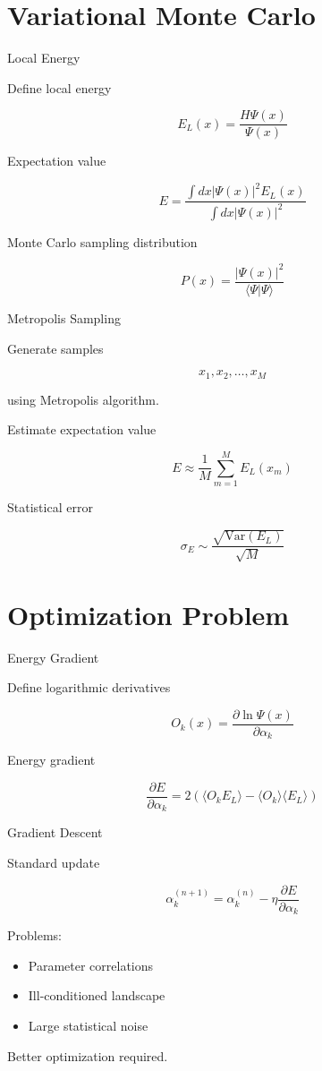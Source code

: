 \documentclass{beamer}
\begin{document}
\section{Variational Monte Carlo}

\begin{frame}{Local Energy}

Define local energy

\[
E_L(x) =
\frac{H\Psi(x)}{\Psi(x)}
\]

Expectation value

\[
E = \frac{\int dx |\Psi(x)|^2 E_L(x)}
{\int dx |\Psi(x)|^2}
\]

Monte Carlo sampling distribution

\[
P(x) = \frac{|\Psi(x)|^2}{\langle\Psi|\Psi\rangle}
\]
\end{frame}

\begin{frame}{Metropolis Sampling}

Generate samples

\[
x_1,x_2,\dots,x_M
\]

using Metropolis algorithm.

Estimate expectation value

\[
E \approx
\frac{1}{M}\sum_{m=1}^{M} E_L(x_m)
\]

Statistical error

\[
\sigma_E \sim \frac{\sqrt{\text{Var}(E_L)}}{\sqrt{M}}
\]
\end{frame}

\section{Optimization Problem}

\begin{frame}{Energy Gradient}

Define logarithmic derivatives

\[
O_k(x)=
\frac{\partial \ln \Psi(x)}{\partial \alpha_k}
\]

Energy gradient

\[
\frac{\partial E}{\partial \alpha_k}
=
2(\langle O_k E_L\rangle
-
\langle O_k\rangle\langle E_L\rangle)
\]
\end{frame}

\begin{frame}{Gradient Descent}

Standard update

\[
\alpha_k^{(n+1)}
=
\alpha_k^{(n)} - \eta
\frac{\partial E}{\partial \alpha_k}
\]

Problems:

\begin{itemize}
\item Parameter correlations
\item Ill-conditioned landscape
\item Large statistical noise
\end{itemize}

Better optimization required.
\end{frame}
\end{document}
